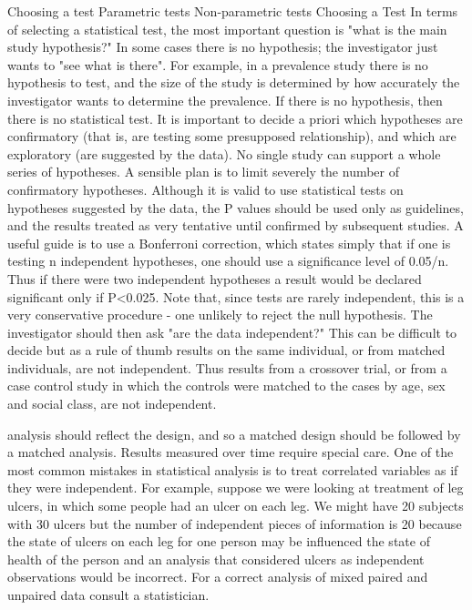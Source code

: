 Choosing a test
Parametric tests
Non-parametric tests
Choosing a Test In terms of selecting a statistical test, the most important question is "what is the main study hypothesis?" In some cases there is no hypothesis; the investigator just wants to "see what is there". For example, in a prevalence study there is no hypothesis to test, and the size of the study is determined by how accurately the investigator wants to determine the prevalence. If there is no hypothesis, then there is no statistical test. It is important to decide a priori which hypotheses are confirmatory (that is, are testing some presupposed relationship), and which are exploratory (are suggested by the data). No single study can support a whole series of hypotheses. A sensible plan is to limit severely the number of confirmatory hypotheses. Although it is valid to use statistical tests on hypotheses suggested by the data, the P values should be used only as guidelines, and the results treated as very tentative until confirmed by subsequent studies. A useful guide is to use a Bonferroni correction, which states simply that if one is testing n independent hypotheses, one should use a significance level of 0.05/n. Thus if there were two independent hypotheses a result would be declared significant only if P<0.025. Note that, since tests are rarely independent, this is a very conservative procedure - one unlikely to reject the null hypothesis. The investigator should then ask "are the data independent?" This can be difficult to decide but as a rule of thumb results on the same individual, or from matched individuals, are not independent. Thus results from a crossover trial, or from a case control study in which the controls were matched to the cases by age, sex and social class, are not independent.

analysis should reflect the design, and so a matched design should be followed by a matched analysis.
Results measured over time require special care. One of the most common mistakes in statistical analysis is to treat correlated variables as if they were independent. For example, suppose we were looking at treatment of leg ulcers, in which some people had an ulcer on each leg. We might have 20 subjects with 30 ulcers but the number of independent pieces of information is 20 because the state of ulcers on each leg for one person may be influenced the state of health of the person and an analysis that considered ulcers as independent observations would be incorrect. For a correct analysis of mixed paired and unpaired data consult a statistician.
 
